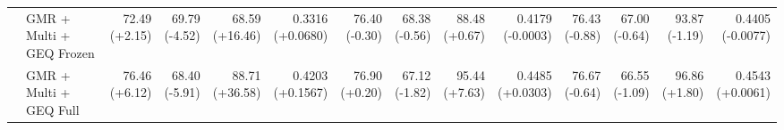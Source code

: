\documentclass{article}
\begin{document}
{\begin{tabular}{llrrrrrrrrrrrr}
 & GMR + Multi + GEQ Frozen & \shortstack{72.49 \\ {\scriptsize\textcolor{Gain}{(+2.15)}}} & \shortstack{69.79 \\ {\scriptsize\textcolor{Loss}{(-4.52)}}} & \shortstack{68.59 \\ {\scriptsize\textcolor{Gain}{(+16.46)}}} & \shortstack{0.3316 \\ {\scriptsize\textcolor{Gain}{(+0.0680)}}} & \shortstack{76.40 \\ {\scriptsize\textcolor{Loss}{(-0.30)}}} & \shortstack{68.38 \\ {\scriptsize\textcolor{Loss}{(-0.56)}}} & \shortstack{88.48 \\ {\scriptsize\textcolor{Gain}{(+0.67)}}} & \shortstack{0.4179 \\ {\scriptsize\textcolor{Loss}{(-0.0003)}}} & \shortstack{76.43 \\ {\scriptsize\textcolor{Loss}{(-0.88)}}} & \shortstack{67.00 \\ {\scriptsize\textcolor{Loss}{(-0.64)}}} & \shortstack{93.87 \\ {\scriptsize\textcolor{Loss}{(-1.19)}}} & \shortstack{0.4405 \\ {\scriptsize\textcolor{Loss}{(-0.0077)}}} \\
 & GMR + Multi + GEQ Full & \shortstack{76.46 \\ {\scriptsize\textcolor{Gain}{(+6.12)}}} & \shortstack{68.40 \\ {\scriptsize\textcolor{Loss}{(-5.91)}}} & \shortstack{88.71 \\ {\scriptsize\textcolor{Gain}{(+36.58)}}} & \shortstack{0.4203 \\ {\scriptsize\textcolor{Gain}{(+0.1567)}}} & \shortstack{76.90 \\ {\scriptsize\textcolor{Gain}{(+0.20)}}} & \shortstack{67.12 \\ {\scriptsize\textcolor{Loss}{(-1.82)}}} & \shortstack{95.44 \\ {\scriptsize\textcolor{Gain}{(+7.63)}}} & \shortstack{0.4485 \\ {\scriptsize\textcolor{Gain}{(+0.0303)}}} & \shortstack{76.67 \\ {\scriptsize\textcolor{Loss}{(-0.64)}}} & \shortstack{66.55 \\ {\scriptsize\textcolor{Loss}{(-1.09)}}} & \shortstack{96.86 \\ {\scriptsize\textcolor{Gain}{(+1.80)}}} & \shortstack{0.4543 \\ {\scriptsize\textcolor{Gain}{(+0.0061)}}} \\

\end{tabular}}
\end{document}
